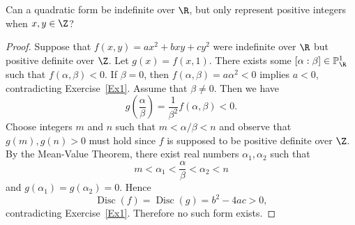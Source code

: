 \documentclass[10pt]{amsart}
\begin{document}
\begin{thm}
  Can a quadratic form be indefinite over $\R$, but only represent positive integers when $x, y \in \Z$?

  \begin{proof}
    Suppose that $f(x,y) = ax^2 + bxy + cy^2$ were indefinite over $\R$ but positive definite over $\Z$.
    Let $g(x) = f(x,1)$.
    There exists some $[\alpha : \beta] \in \mathbb{P}_{\R}^1$ such that $f(\alpha,\beta) < 0$.
    If $\beta = 0$, then $f(\alpha,\beta) = a\alpha^2 < 0$ implies $a < 0$, contradicting Exercise~\ref{Ex1}.
    Assume that $\beta \neq 0$.
    Then we have
    $$g\left(\frac{\alpha}{\beta}\right) = \frac{1}{\beta^2}f(\alpha, \beta) < 0.$$
    Choose integers $m$ and $n$ such that $m < \alpha/\beta < n$ and observe that $g(m), g(n) > 0$ must hold since $f$ is supposed to be positive definite over $\Z$.
    By the Mean-Value Theorem, there exist real numbers $\alpha_1, \alpha_2$ such that 
    $$m < \alpha_1 < \frac{\alpha}{\beta} < \alpha_2 < n$$
    and $g(\alpha_1) = g(\alpha_2) = 0$.
    Hence 
    $$\operatorname{Disc}(f) = \operatorname{Disc}(g) = b^2 - 4ac> 0,$$
    contradicting Exercise~\ref{Ex1}.
    Therefore no such form exists.		
  \end{proof}
\end{thm}
\end{document}
